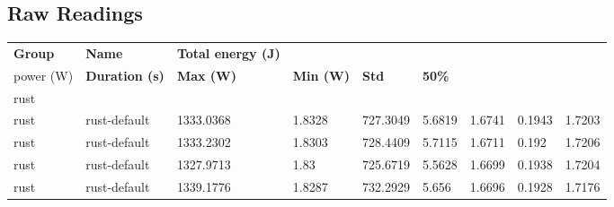 \subsection{Raw Readings}
\label{sec:raw-readings}

\begin{longtable}[h]{|lllllllll|}
\hline
\hline
\textbf{Group} & \textbf{Name}          & \textbf{Total energy (J)} & \textbf{\begin{tabular}[c]{@{}l@{}}Average\\ power (W)\end{tabular}} & \textbf{Duration (s)} & \textbf{Max (W)} & \textbf{Min (W)} & \textbf{Std} & \textbf{50\%} \\
\hline
rust           &                        &                           &                                                                      &                       &                  &                  &              &               \\
rust           & rust-default           & 1333.0368                 & 1.8328                                                               & 727.3049              & 5.6819           & 1.6741           & 0.1943       & 1.7203        \\
rust           & rust-default           & 1333.2302                 & 1.8303                                                               & 728.4409              & 5.7115           & 1.6711           & 0.192        & 1.7206        \\
rust           & rust-default           & 1327.9713                 & 1.83                                                                 & 725.6719              & 5.5628           & 1.6699           & 0.1938       & 1.7204        \\
rust           & rust-default           & 1339.1776                 & 1.8287                                                               & 732.2929              & 5.656            & 1.6696           & 0.1928       & 1.7176        \\

\end{longtable}
